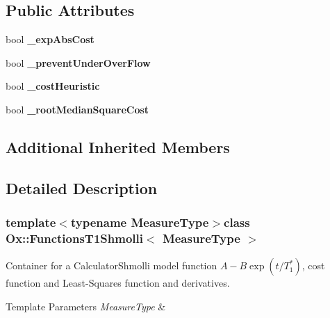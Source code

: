 \subsection*{Public Attributes}
\begin{DoxyCompactItemize}
\item 
\hypertarget{class_ox_1_1_functions_t1_shmolli_a2aa59f302cc9817439a51a495091e720}{bool {\bfseries \-\_\-exp\-Abs\-Cost}}\label{class_ox_1_1_functions_t1_shmolli_a2aa59f302cc9817439a51a495091e720}

\item 
\hypertarget{class_ox_1_1_functions_t1_shmolli_a6882acc91ebc1e09d787ec6b132490ba}{bool {\bfseries \-\_\-prevent\-Under\-Over\-Flow}}\label{class_ox_1_1_functions_t1_shmolli_a6882acc91ebc1e09d787ec6b132490ba}

\item 
\hypertarget{class_ox_1_1_functions_t1_shmolli_a170f4b51c894fbc5e778bda5842cc7f7}{bool {\bfseries \-\_\-cost\-Heuristic}}\label{class_ox_1_1_functions_t1_shmolli_a170f4b51c894fbc5e778bda5842cc7f7}

\item 
\hypertarget{class_ox_1_1_functions_t1_shmolli_adaa80c1d1837880adc81560b02a575d0}{bool {\bfseries \-\_\-root\-Median\-Square\-Cost}}\label{class_ox_1_1_functions_t1_shmolli_adaa80c1d1837880adc81560b02a575d0}

\end{DoxyCompactItemize}
\subsection*{Additional Inherited Members}


\subsection{Detailed Description}
\subsubsection*{template$<$typename Measure\-Type$>$class Ox\-::\-Functions\-T1\-Shmolli$<$ Measure\-Type $>$}

Container for a Calculator\-Shmolli model function $ A-B\exp(t/T_1^*) $, cost function and Least-\/\-Squares function and derivatives. 


\begin{DoxyTemplParams}{Template Parameters}
{\em Measure\-Type} & \\
\hline
\end{DoxyTemplParams}


